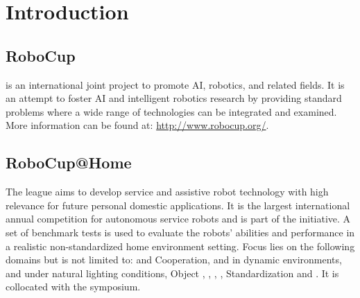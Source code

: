 \chapter{Introduction}
\label{chap:introduction}


\section{RoboCup}
\label{sec:introduction:robocup}
\RoboCup{} is an international joint project to promote AI, robotics, and related fields. It is an attempt to foster AI and intelligent robotics research by providing standard problems where a wide range of technologies can be integrated and examined. More information can be found at:
{\small\url{http://www.robocup.org/}}.


\section{RoboCup@Home}
\label{sec:introduction:robocupathome}
The \AtHome{} league aims to develop service and assistive robot technology with high relevance for future personal domestic applications. It is the largest international annual competition for autonomous service robots and is part of the \RoboCup{} initiative. A set of benchmark tests is used to evaluate the robots' abilities and performance in a realistic non-standardized home environment setting. Focus lies on the following domains but is not limited to: \HRI{} and Cooperation, \NAV{} and \MAP{} in dynamic environments, \CV{} and \OR{} under natural lighting conditions, Object \MAN{}, \AB{}, \BI{}, \AmI{}, Standardization and \SysI{}. It is collocated with the \RoboCup{} symposium.











